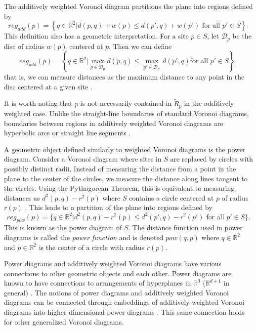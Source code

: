 \documentclass[a4paper, 11pt]{article}
\newcommand{\R}{\mathbb{R}}
\begin{document}
The additively weighted Voronoi diagram partitions the plane into regions defined by
\begin{equation*}
  reg_{add}(p) = \left\{ q \in \R^2 | d(p,q) + w(p) \leq d(p',q) + w(p') \text{ for all } p' \in S \right\}.
\end{equation*}
This definition also has a geometric interpretation. For a site $p \in S$, let $\mathcal{D}_p$ be the disc of radius $w(p)$ centered at $p$. Then we
can define
\begin{equation*}
  reg_{add}(p) = \left\{ q \in \R^2 | \max_{\tilde{p} \in \mathcal{D}_p} d(\tilde{p}, q) \leq \max_{\tilde{p}' \in \mathcal{D}_{p'}} d(\tilde{p}', q) \text{
  for all } p' \in S \right\},
\end{equation*}
that is, we can measure distances as the maximum distance to any point in the disc centered at a given site \cite{rosenberger_additive}.

It is worth noting that $p$ is not necessarily contained in $\tilde{R}_p$ in the additively weighted case. Unlike the straight-line boundaries of standard
Voronoi diagrams, boundaries between regions in additively weighted Voronoi diagrams are hyperbolic arcs or straight line segments \cite{aurenhammer_additive}.

A geometric object defined similarly to weighted Voronoi diagrams is the power diagram. Consider a Voronoi diagram where sites in $S$ are replaced by
circles with possibly distinct radii. Instead of measuring the distance from a point in the plane to the center of the circles, we measure the distance
along lines tangent to the circles. Using the Pythagorean Theorem, this is equivalent to measuring distances as $d^2(p,q) -
r^2(p)$ where $S$ contains a circle centered at $p$ of radius $r(p)$ \cite{aurenhammer_power}. This leads to a partition of the plane into regions defined by
\begin{equation*}
  reg_{pow}(p) = \{ q \in \R^2 | d^2(p,q) - r^2(p) \leq d^2(p',q) - r^2(p') \text{ for all } p' \in S \}.
\end{equation*}
This is known as the power diagram of $S$. The distance function used in power diagrams is called the \textit{power function} and is denoted
$pow(q,p)$ where $q \in \R^2$ and $p \in \R^2$ is the center of a circle with radius $r(p)$.

Power diagrams and additively weighted Voronoi diagrams have various connections to other geometric objects and each other.
Power diagrams are known to have connections to arrangements of hyperplanes in $\R^3$ ($\R^{d+1}$ in general) \cite{aurenhammer_survey}. The notions
of power diagrams and additively weighted Voronoi diagrams can be connected through embeddings of additively weighted Voronoi diagrams into
higher-dimensional power diagrams \cite{aurenhammer_additive}. This same connection holds for other generalized Voronoi diagrams.
\end{document}
